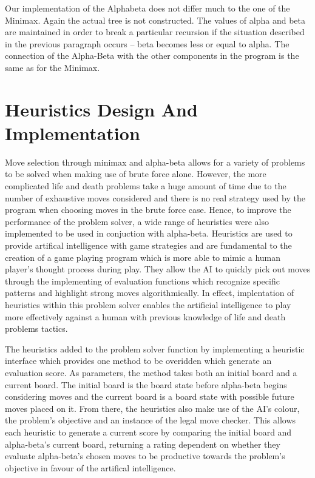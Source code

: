 \documentclass{l3proj}
\begin{document}
Our implementation of the Alphabeta does not differ much to the one of the Minimax. Again the actual tree is not constructed. The values of alpha and beta are maintained in order to break a particular recursion if the situation described in the previous paragraph occurs – beta becomes less or equal to alpha. The connection of the Alpha-Beta with the other components in the program is the same as for the Minimax.

\section{Heuristics Design And Implementation}

Move selection through minimax and alpha-beta allows for a variety of problems to be solved when making use of brute force alone. However, the more complicated life and death problems take a huge amount of time due to the number of exhaustive moves considered and there is no real strategy used by the program when choosing moves in the brute force case. Hence, to improve the performance of the problem solver, a wide range of heuristics were also implemented to be used in conjuction with alpha-beta. Heuristics are used to provide artifical intelligence with game strategies and are fundamental to the creation of a game playing program which is more able to mimic a human player's thought process during play. They allow the AI to quickly pick out moves through the implementing of evaluation functions which recognize specific patterns and highlight strong moves algorithmically. In effect, implentation of heuristics within this problem solver enables the artificial intelligence to play more effectively against a human with previous knowledge of life and death problems tactics.

The heuristics added to the problem solver function by implementing a heuristic interface which provides one method to be overidden which generate an evaluation score. As parameters, the method takes both an initial board and a current board. The initial board is the board state before alpha-beta begins considering moves and the current board is a board state with possible future moves placed on it. From there, the heuristics also make use of the AI's colour, the problem's objective and an instance of the legal move checker. This allows each heuristic to generate a current score by comparing the initial board and alpha-beta's current board, returning a rating dependent on whether they evaluate alpha-beta's chosen moves to be productive towards the problem's objective in favour of the artifical intelligence.
\end{document}
